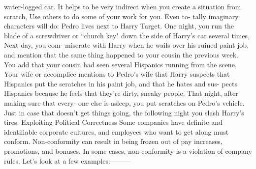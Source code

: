 \documentclass{book}
\begin{document}
water-logged car. 
It helps to be very indirect when you create a situation from 
scratch, Use others to do some of your work for you. Even to- 
tally imaginary characters will do: 
Pedro lives next to Harry Target. One night, you run 
the blade of a screwdriver or “church key" down the 
side of Harry's car several times, Next day, you com- 
miserate with Harry when he wails over his ruined 
paint job, and mention that the same thing happened to 
your cousin the previous week. You add that your 
cousin had seen several Hispanics running from the 
scene. Your wife or accomplice mentions to Pedro's 
wife that Harry suspects that Hispanics put the 
seratches in his paint job, and that he hates and sus- 
pects Hispanics because he feels that they're dirty, 
sneaky people. That night, after making sure that every- 
one else is asleep, you put scratches on Pedro's vehicle. 
Just in case that doesn't get things going, the following 
night you slash Harry's tires. 
Exploiting Political Correctness 
Some companies have definite and identifiable corporate 
cultures, and employees who want to get along must conform. 
Non-conformity can result in being frozen out of pay increases, 
promotions, and bonuses. In some cases, non-conformity is a 
violation of company rules. Let's look at a few examples:——— 
 
\end{document}
